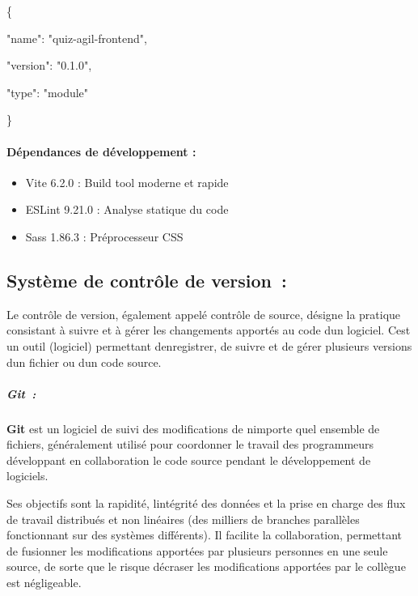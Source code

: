 \documentclass[12pt,a4paper,twoside]{report}
\begin{document}
\{

"name": "quiz-agil-frontend",

"version": "0.1.0",

"type": "module"

\}

\hypertarget{duxe9pendances-de-duxe9veloppement}{%
\paragraph{\texorpdfstring{\textbf{Dépendances de développement
:}}{Dépendances de développement :}}\label{duxe9pendances-de-duxe9veloppement}}

\begin{itemize}
\item
  Vite 6.2.0 : Build tool moderne et rapide
\item
  ESLint 9.21.0 : Analyse statique du code
\item
  Sass 1.86.3 : Préprocesseur CSS
\end{itemize}

\hypertarget{systuxe8me-de-contruxf4le-de-version}{%
\subsection{Système de contrôle de
version~:}\label{systuxe8me-de-contruxf4le-de-version}}

Le contrôle de version, également appelé contrôle de source, désigne la
pratique consistant à suivre et à gérer les changements apportés au code
d\textquotesingle un logiciel. C\textquotesingle est un outil (logiciel)
permettant d\textquotesingle enregistrer, de suivre et de gérer
plusieurs versions d\textquotesingle un fichier ou d\textquotesingle un
code source.

\hypertarget{git}{%
\subparagraph{Git~:}\label{git}}

\textbf{Git} est un logiciel de suivi des modifications de
n\textquotesingle importe quel ensemble de fichiers, généralement
utilisé pour coordonner le travail des programmeurs développant en
collaboration le code source pendant le développement de logiciels.

Ses objectifs sont la rapidité, l\textquotesingle intégrité des données
et la prise en charge des flux de travail distribués et non linéaires
(des milliers de branches parallèles fonctionnant sur des systèmes
différents). Il facilite la collaboration, permettant de fusionner les
modifications apportées par plusieurs personnes en une seule source, de
sorte que le risque d\textquotesingle écraser les modifications
apportées par le collègue est négligeable.
\end{document}
